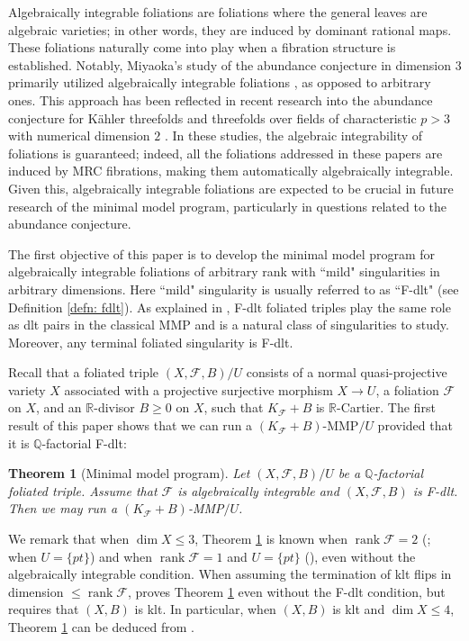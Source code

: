 \documentclass[11pt]{amsart}
\numberwithin{equation}{section}
\newcommand{\Qq}{\mathbb{Q}}
\newcommand{\Rr}{\mathbb{R}}
\newcommand{\rk}{\operatorname{rank}}
\newcommand{\Ff}{\mathcal{F}}
\newtheorem{thm}{Theorem}[subsection]
\theoremstyle{definition}
\theoremstyle{definition}
\theoremstyle{definition}
\begin{document}
Algebraically integrable foliations are foliations where the general leaves are algebraic varieties; in other words, they are induced by dominant rational maps. These foliations naturally come into play when a fibration structure is established. Notably, Miyaoka's study of the abundance conjecture in dimension $3$ primarily utilized algebraically integrable foliations \cite{Miy87}, as opposed to arbitrary ones. This approach has been reflected in recent research into the abundance conjecture for Kähler threefolds \cite{DO23a,DO23b} and threefolds over fields of characteristic $p>3$ with numerical dimension $2$ \cite{Xu23}. In these studies, the algebraic integrability of foliations is guaranteed; indeed, all the foliations addressed in these papers are induced by MRC fibrations, making them automatically algebraically integrable. Given this, algebraically integrable foliations are expected to be crucial in future research of the minimal model program, particularly in questions related to the abundance conjecture.

The first objective of this paper is to develop the minimal model program for algebraically integrable foliations of arbitrary rank with ``mild" singularities in arbitrary dimensions. Here ``mild" singularity is usually referred to as ``F-dlt" (see Definition \ref{defn: fdlt}). As explained in \cite{CS21,SS22}, F-dlt foliated triples play the same role as dlt pairs in the classical MMP and is a natural class of singularities to study. Moreover, any terminal foliated singularity is F-dlt.

Recall that a foliated triple $(X,\Ff,B)/U$ consists of a normal quasi-projective variety $X$ associated with a projective surjective morphism $X\rightarrow U$, a foliation $\Ff$ on $X$, and an $\Rr$-divisor $B\geq 0$ on $X$, such that $K_{\Ff}+B$ is $\Rr$-Cartier. The first result of this paper shows that we can run a $(K_{\Ff}+B)$-MMP$/U$ provided that it is $\Qq$-factorial F-dlt:

\begin{thm}[Minimal model program]\label{thm: mmp fdlt}
    Let $(X,\Ff,B)/U$ be a $\Qq$-factorial foliated triple. Assume that $\Ff$ is algebraically integrable and $(X,\Ff,B)$ is F-dlt. Then we may run a $(K_{\Ff}+B)$-MMP$/U$.
\end{thm}

We remark that when $\dim X\leq 3$, Theorem \ref{thm: mmp fdlt} is known when $\rk\Ff=2$ (\cite[Corollary 2.3]{SS22}; \cite[Theorem 1.1]{CS21} when $U=\{pt\}$) and when $\rk\Ff=1$ and $U=\{pt\}$ (\cite[Theorems 1.1, 2.36, Section 6]{CS21}), even without the algebraically integrable condition. When assuming the termination of klt flips in dimension $\leq\rk\Ff$, \cite[Theorem 1.1]{CS23a} proves Theorem \ref{thm: mmp fdlt} even without the F-dlt condition, but requires that $(X,B)$ is klt. In particular, when $(X,B)$ is klt and $\dim X\leq 4$, Theorem \ref{thm: mmp fdlt} can be deduced from \cite[Theorem 1.1]{CS23a}.
\end{document}
